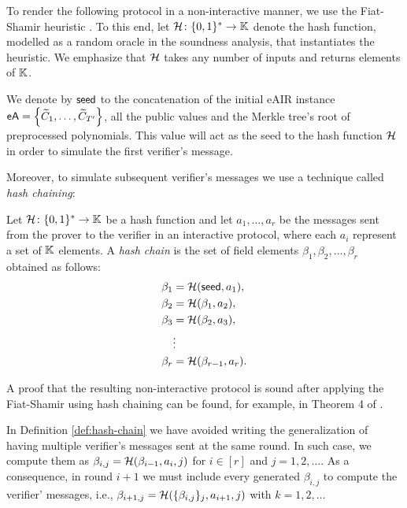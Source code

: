 \ifNOPOLYGON
To render the following protocol in a non-interactive manner, we use the Fiat-Shamir heuristic \cite{C:FiaSha86}. To this end, let $\mathcal{H} \colon \{0,1\}^* \to \mathbb{K}$ denote the hash function, modelled as a random oracle in the soundness analysis, that instantiates the heuristic. We emphasize that $\mathcal{H}$ takes any number of inputs and returns elements of $\mathbb{K}$.
\fi

We denote by $\textsf{seed}$ to the concatenation of the initial eAIR instance $\textsf{eA} = \left\{\widetilde{C}_1,\dots,\widetilde{C}_{T'}\right\}$, all the public values and the Merkle tree's root of preprocessed polynomials. This value will act as the seed to the hash function $\mathcal{H}$ in order to simulate the first verifier's message. 

\ifNOPOLYGON
Moreover, to simulate subsequent verifier's messages we use a technique called \textit{hash chaining}:
\begin{definition}\label{def:hash-chain}
  Let $\mathcal{H} \colon \{0,1\}^* \to \mathbb{K}$ be a hash function and let $a_1,\dots,a_r$ be the messages sent from the prover to the verifier in an interactive protocol, where each $a_i$ represent a set of $\mathbb{K}$ elements.
  A \textit{hash chain} is the set of field elements $\beta_1,\beta_2,\dots,\beta_r$ obtained as follows:
  \begin{align*}
    \beta_1 &= \mathcal{H}(\textsf{seed}, a_1), \\
    \beta_2 &= \mathcal{H}(\beta_1, a_2), \\
    \beta_3 &= \mathcal{H}(\beta_2, a_3), \\
    &\vdots \\
    \beta_r &= \mathcal{H}(\beta_{r-1}, a_r).
  \end{align*}
\end{definition}
A proof that the resulting non-interactive protocol is sound after applying the Fiat-Shamir using hash chaining can be found, for example, in Theorem 4 of \cite{EPRINT:AttFehKlo21}.

\begin{remark}
  In Definition \ref{def:hash-chain} we have avoided writing the generalization of having multiple verifier's messages sent at the same round. In such case, we compute them as $\beta_{i,j} = \mathcal{H}(\beta_{i-1},a_i,j)$ for $i \in [r]$ and $j = 1,2,\dots$. As a consequence, in round $i+1$ we must include every generated $\beta_{i,j}$ to compute the verifier' messages, i.e.,  $\beta_{i+1,j} = \mathcal{H}(\{\beta_{i,j}\}_j,a_{i+1},j)$ with $k = 1,2,\dots$
\end{remark}
\fi

